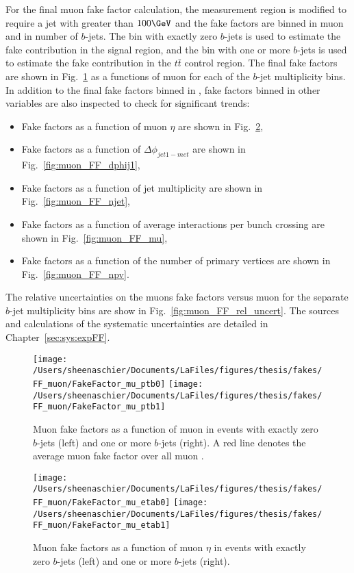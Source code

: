For the final muon fake factor calculation, the measurement region is modified to require a jet with \pt{} greater than $100\GeV$ and the fake factors are binned in muon \pt and in number of $b$-jets.  The bin with exactly zero $b$-jets is used to estimate the fake contribution in the signal region, and the bin with one or more $b$-jets is used to estimate the fake contribution in the $t\bar{t}$ control region.  The final fake factors are shown in Fig.~\ref{fig:muon_FF_hist} as a functions of muon \pt{} for each of the $b$-jet multiplicity bins.  In addition to the final fake factors binned in \pt, fake factors binned in other variables are also inspected to check for significant trends:
\begin{itemize}
\item Fake factors as a function of muon $\eta$ are shown in Fig.~\ref{fig:muon_FF_hist_eta},
\item Fake factors as a function of $\Delta\phi_{jet1-met}$ are shown in Fig.~\ref{fig:muon_FF_dphij1},
\item Fake factors as a function of jet multiplicity are shown in Fig.~\ref{fig:muon_FF_njet},
\item Fake factors as a function of average interactions per bunch crossing are shown in Fig.~\ref{fig:muon_FF_mu},
\item Fake factors as a function of the number of primary vertices are shown in Fig.~\ref{fig:muon_FF_npv}.
\end{itemize}
The relative uncertainties on the muons fake factors versus muon \pt{} for the separate $b$-jet multiplicity bins are show in Fig.~\ref{fig:muon_FF_rel_uncert}.  The sources and calculations of the systematic uncertainties are detailed in Chapter~\ref{sec:sys:expFF}.
\begin{figure}[tbp]
  \centering
  \texttt{[image: /Users/sheenaschier/Documents/LaFiles/figures/thesis/fakes/FF\_muon/FakeFactor\_mu\_ptb0]}
  \texttt{[image: /Users/sheenaschier/Documents/LaFiles/figures/thesis/fakes/FF\_muon/FakeFactor\_mu\_ptb1]}\\
  \caption{Muon fake factors as a function of muon \pt{} in events with exactly zero $b$-jets (left) and one or more $b$-jets (right). A red line denotes the average muon fake factor over all muon \pt{}.}
  \label{fig:muon_FF_hist}
\end{figure}

\begin{figure}[tbp]
  \centering
  \texttt{[image: /Users/sheenaschier/Documents/LaFiles/figures/thesis/fakes/FF\_muon/FakeFactor\_mu\_etab0]}
  \texttt{[image: /Users/sheenaschier/Documents/LaFiles/figures/thesis/fakes/FF\_muon/FakeFactor\_mu\_etab1]}\\
  \caption{Muon fake factors as a function of muon $\eta$ in events with exactly zero $b$-jets (left) and one or more $b$-jets (right).}
  \label{fig:muon_FF_hist_eta}
\end{figure}

